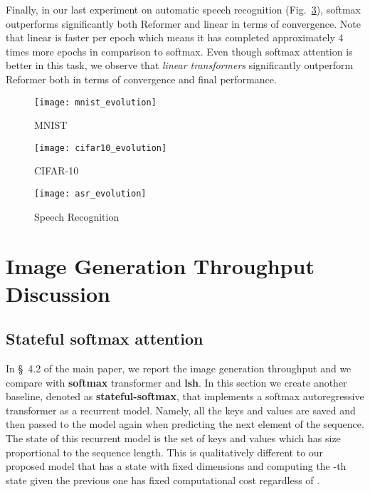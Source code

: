 \documentclass{article}
\newcommand{\linears}{\emph{linear transformers}}
\begin{document}
Finally, in our last experiment on automatic speech recognition
(Fig.~\ref{fig:evo_asr}), softmax outperforms significantly both Reformer and
linear in terms of convergence. Note that linear is  faster per epoch
which means it has completed approximately 4 times more epochs in comparison to
softmax. Even though softmax attention is better in this task, we observe that
\linears{} significantly outperform Reformer both in terms of convergence and
final performance.

\begin{figure*}[h]
    \centering
    \begin{subfigure}[t]{0.33\columnwidth}
        \texttt{[image: mnist\_evolution]}
        \caption{MNIST} \label{fig:evo_mnist}
    \end{subfigure}
    \begin{subfigure}[t]{0.33\columnwidth}
        \texttt{[image: cifar10\_evolution]}
        \caption{CIFAR-10} \label{fig:evo_cifar}
    \end{subfigure}
    \begin{subfigure}[t]{0.33\columnwidth}
        \texttt{[image: asr\_evolution]}
        \caption{Speech Recognition} \label{fig:evo_asr}
    \end{subfigure}
    \caption{Training evolution of transformers for all our experiments. It can
             be observed that \linears{} converge consistently faster than
             Reformer and in the autoregressive experiments on par with
             softmax. For MNIST all methods are trained for 250 epochs while
             for CIFAR we train for 7 days. In the speech recognition
             experiments all methods are trained to convergence. The details of
             the experiments can be found in \S~4.2.1, \S~4.2.2 and \S~4.3 in
             the main paper.}
    \label{fig:evo}
\end{figure*}

\section{Image Generation Throughput Discussion} \label{sec:imgen-discussion}

\subsection{Stateful softmax attention} \label{sec:imgen-discussion-1}

In \S~4.2 of the main paper, we report the image generation
throughput and we compare with \textbf{softmax} transformer and \textbf{lsh}.
In this section we create another baseline, denoted as
\textbf{stateful-softmax}, that implements a softmax autoregressive transformer
as a recurrent model. Namely, all the keys and values are saved and then passed
to the model again when predicting the next element of the sequence. The state
of this recurrent model is the set of keys and values which has size
proportional to the sequence length. This is qualitatively different to our
proposed model that has a state with fixed dimensions and computing the -th
state given the previous one has fixed computational cost regardless of .
\end{document}
